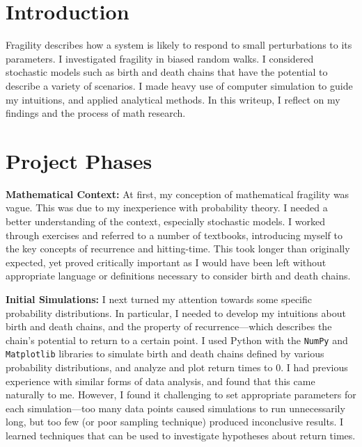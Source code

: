 \documentclass[12pt,letterpaper]{article}
\begin{document}
\section*{Introduction}
Fragility describes how a system is likely to respond to small perturbations to its parameters.
I investigated fragility in biased random walks. I considered stochastic models such as birth
and death chains that have the potential to describe a variety of scenarios. I made heavy use of
computer simulation to guide my intuitions, and applied analytical methods. In this writeup, I reflect
on my findings and the process of math research.


\section*{Project Phases}
\noindent
\textbf{Mathematical Context:} At first, my conception of mathematical fragility was vague. This was due
to my inexperience with probability theory. I needed a better understanding of the context, especially
stochastic models. I worked through exercises and referred to a number of textbooks, introducing myself
to the key concepts of recurrence and hitting-time. This took longer than originally expected, yet
proved critically important as I would have been left without appropriate language or definitions
necessary to consider birth and death chains.

\noindent
\textbf{Initial Simulations:} I next turned my attention towards some specific probability
distributions. In particular, I needed to develop my intuitions about birth and death chains, and the
property of recurrence---which describes the chain's potential to return to a certain point. I used
Python with the \texttt{NumPy} and \texttt{Matplotlib} libraries to simulate birth and death chains
defined by various probability distributions, and analyze and plot return times to $0$. I had previous
experience with similar forms of data analysis, and found that this came naturally to me.  However, I
found it challenging to set appropriate parameters for each simulation---too many data points caused
simulations to run unnecessarily long, but too few (or poor sampling technique) produced inconclusive
results. I learned techniques that can be used to investigate hypotheses about return times.
\end{document}

